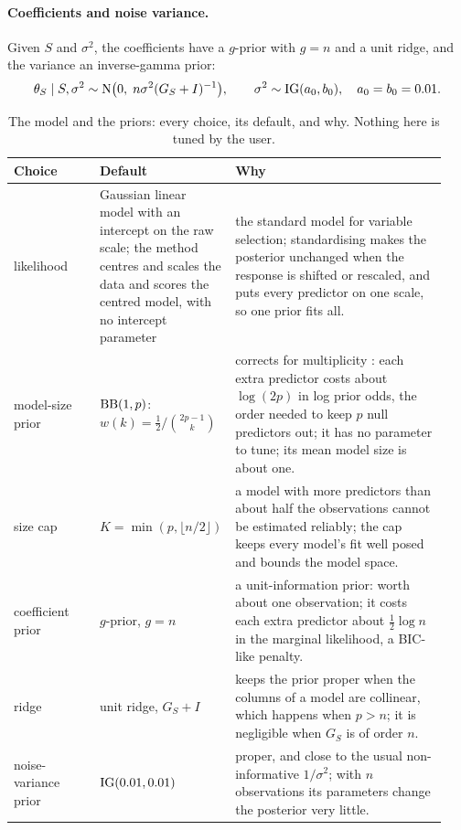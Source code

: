 \paragraph{Coefficients and noise variance.} Given $S$ and $\sigma^2$, the coefficients have a $g$-prior
\citep{Zellner1986} with $g=n$ and a unit ridge, and the variance an inverse-gamma prior:
\begin{equation}\label{eq:slab}
  \theta_S\mid S,\sigma^2\sim\mathrm{N}\big(0,\;n\sigma^2(G_S+I)^{-1}\big),\qquad \sigma^2\sim\mathrm{IG}(a_0,b_0),\quad a_0=b_0=0.01 .
\end{equation}

\begin{table}[ht]
\centering\small
\setlength{\tabcolsep}{4pt}
\caption{The model and the priors: every choice, its default, and why. Nothing here is tuned by the user.}\label{tab:prior}
\begin{tabular}{@{}>{\raggedright\arraybackslash}p{0.2\linewidth}>{\raggedright\arraybackslash}p{0.24\linewidth}>{\raggedright\arraybackslash}p{0.5\linewidth}@{}}
\toprule
Choice & Default & Why \\
\midrule
likelihood & Gaussian linear model with an intercept on the raw scale; the method centres and scales the data and
scores the centred model, with no intercept parameter &
the standard model for variable selection; standardising makes the posterior unchanged when the response is shifted or
rescaled, and puts every predictor on one scale, so one prior fits all. \\
model-size prior & $\mathrm{BB}(1,p)$: $w(k)=\tfrac12/\binom{2p-1}{k}$ &
corrects for multiplicity \citep{ScottBerger2010}: each extra predictor costs about $\log(2p)$ in log prior odds,
the order needed to keep $p$ null predictors out; it has no parameter to tune; its mean model size is about one. \\
size cap & $K=\min(p,\lfloor n/2\rfloor)$ &
a model with more predictors than about half the observations cannot be estimated reliably; the cap keeps every model's
fit well posed and bounds the model space. \\
coefficient prior & $g$-prior, $g=n$ &
a unit-information prior: worth about one observation; it costs each extra predictor about $\tfrac12\log n$ in the
marginal likelihood, a BIC-like penalty. \\
ridge & unit ridge, $G_S+I$ &
keeps the prior proper when the columns of a model are collinear, which happens when $p>n$; it is negligible when
$G_S$ is of order $n$. \\
noise-variance prior & $\mathrm{IG}(0.01,0.01)$ &
proper, and close to the usual non-informative $1/\sigma^2$; with $n$ observations its parameters change the posterior
very little. \\
\bottomrule
\end{tabular}
\end{table}


